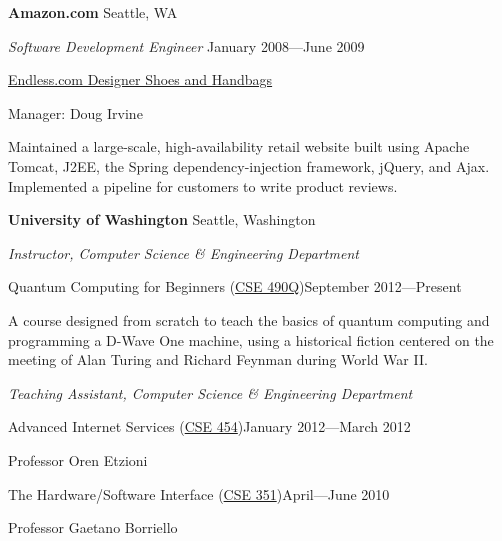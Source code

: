 \documentclass[letter]{article}
\begin{document}
\par

\vspace{\baselineskip}
\par
{\bf {Amazon.com}} \hfill Seattle, WA
\par
{\em Software Development Engineer} \hfill January 2008---June 2009
\par
\href{http://www.endless.com}{Endless.com Designer Shoes and Handbags}
\par
Manager: Doug Irvine
\par
Maintained a large-scale, high-availability
retail website built using Apache Tomcat, J2EE,
the Spring dependency-injection framework, jQuery, and Ajax. Implemented a
pipeline for customers to write product reviews.

\pagebreak

{\bf University of Washington} \hfill Seattle, Washington

\par
{\em Instructor, Computer Science \& Engineering Department}

\vspace{0.5\baselineskip}
\par
Quantum Computing for Beginners (\href{http://www.cs.washington.edu/education/courses/490q/12au/}{CSE 490Q})\hfill September 2012---Present
\par
A course designed from scratch to teach the basics of quantum computing and
programming a D-Wave One machine, using a historical fiction centered on
the meeting of Alan Turing and Richard Feynman during World War II.

\vspace{0.5\baselineskip}
\par
{\em Teaching Assistant, Computer Science \& Engineering Department}

\vspace{0.5\baselineskip}
\par
Advanced Internet Services (\href{http://www.cs.washington.edu/education/courses/454/12wi/}{CSE 454})\hfill January 2012---March 2012
\par
Professor Oren Etzioni

\vspace{0.5\baselineskip}
\par
The Hardware/Software Interface (\href{http://www.cs.washington.edu/education/courses/351/10sp/}{CSE 351})\hfill April---June 2010
\par
Professor Gaetano Borriello
\end{document}
